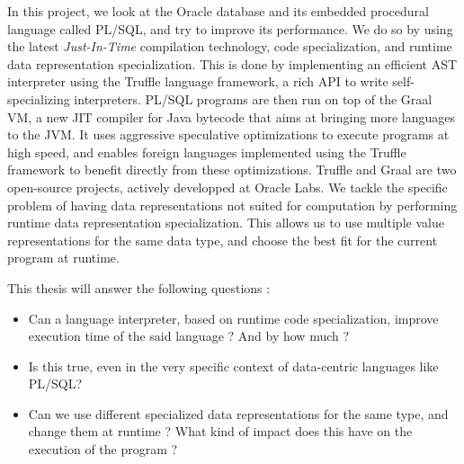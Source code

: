 \documentclass[twoside,11pt,a4paper]{article}
\begin{document}
In this project, we look at the Oracle database and its embedded procedural language called PL/SQL, and try to improve its performance. We do so by using the latest \textit{Just-In-Time} compilation technology, code specialization, and runtime data representation specialization. This is done by implementing an efficient AST interpreter using the Truffle language framework, a rich API to write self-specializing interpreters. PL/SQL programs are then run on top of the Graal VM, a new JIT compiler for Java bytecode that aims at bringing more languages to the JVM. It uses aggressive speculative optimizations to execute programs at high speed, and enables foreign languages implemented using the Truffle framework to benefit directly from these optimizations. Truffle and Graal are two open-source projects, actively developped at Oracle Labs. We tackle the specific problem of having data representations not suited for computation by performing runtime data representation specialization. This allows us to use multiple value representations for the same data type, and choose the best fit for the current program at runtime.

This thesis will answer the following questions :
\begin{itemize}
\item Can a language interpreter, based on runtime code specialization, improve execution time of the said language ? And by how much ?
\item Is this true, even in the very specific context of data-centric languages like PL/SQL?
\item Can we use different specialized data representations for the same type, and change them at runtime ? What kind of impact does this have on the execution of the program ?
\end{itemize}
\end{document}
